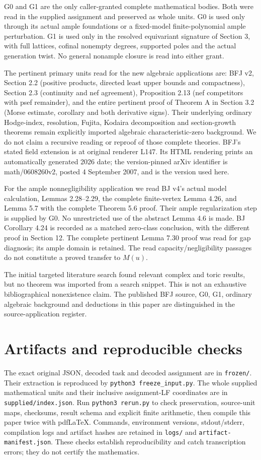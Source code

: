 \documentclass[10pt]{article}
\begin{document}
G0 and G1 are the only caller-granted complete mathematical bodies.
Both were read in the supplied assignment and preserved as whole units.
G0 is used only through its actual ample foundations or a fixed-model
finite-polynomial ample perturbation. G1 is used only in the resolved
equivariant signature of Section 3, with full lattices, cofinal nonempty
degrees, supported poles and the actual generation twist. No general
nonample closure is read into either grant.

The pertinent primary units read for the new algebraic applications are:
BFJ v2, Section 2.2 (positive products, directed least upper bounds and
compactness), Section 2.3 (continuity and nef agreement), Proposition 2.13
(nef competitors with psef remainder), and the entire pertinent proof of
Theorem A in Section 3.2 (Morse estimate, corollary and both derivative
signs). Their underlying ordinary Hodge-index, resolution, Fujita,
Kodaira decomposition and section-growth theorems remain explicitly
imported algebraic characteristic-zero background. We do not claim a
recursive reading or reproof of those complete theories. BFJ's stated
field extension is at original renderer L147. Its HTML rendering prints
an automatically generated 2026 date; the version-pinned arXiv identifier
is math/0608260v2, posted 4 September 2007, and is the version used here.

For the ample nonnegligibility application we read BJ v4's actual model
calculation, Lemmas 2.28--2.29, the complete finite-vertex Lemma 4.26,
and Lemma 5.7 with the complete Theorem 5.6 proof. Their ample
regularization step is supplied by G0. No unrestricted use of the
abstract Lemma 4.6 is made. BJ Corollary 4.24 is recorded as a matched
zero-class conclusion, with the different proof in Section 12. The
complete pertinent Lemma 7.30 proof was read for gap diagnosis; its
ample domain is retained. The read capacity/negligibility passages do
not constitute a proved transfer to $M(u)$.

The initial targeted literature search found relevant complex and toric
results, but no theorem was imported from a search snippet. This is not
an exhaustive bibliographical nonexistence claim. The published BFJ
source, G0, G1, ordinary algebraic background and deductions in this
paper are distinguished in the source-application register.

\section{Artifacts and reproducible checks}
The exact original JSON, decoded task and decoded assignment are in
\texttt{frozen/}. Their extraction is reproduced by
\texttt{python3 freeze\_input.py}. The whole supplied mathematical units
and their inclusive assignment-LF coordinates are in
\texttt{supplied/index.json}. Run \texttt{python3 rerun.py} to check
preservation, source-unit maps, checksums, result schema and explicit
finite arithmetic, then compile this paper twice with pdfLaTeX.
Commands, environment versions, stdout/stderr, compilation logs and
artifact hashes are retained in \texttt{logs/} and
\texttt{artifact-manifest.json}. These checks establish reproducibility
and catch transcription errors; they do not certify the mathematics.
\end{document}

